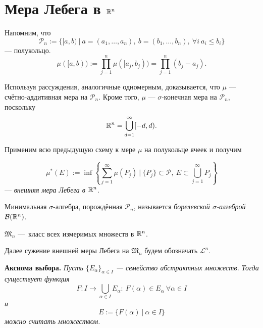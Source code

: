\section{Мера Лебега в $\mathbb{R}^n$}

Напомним, что 
\[\mathcal{P}_n := \{[a,b) \ | \ a = (a_1, \dots, a_n), \ b = (b_1, \dots, b_n), \ \forall i \ a_i \leqslant b_i\}\]
— полукольцо.
\[\mu([a,b)) := \prod\limits_{j=1}^{n} \mu([a_j, b_j)) = \prod\limits_{j=1}^{n} (b_j - a_j).\]

\begin{remark}
    Используя рассуждения, аналогичные одномерным, доказывается, что $\mu$ — счётно-аддитивная мера на $\mathcal{P}_n$.
    Кроме того, $\mu$ — $\sigma$-конечная мера на $\mathcal{P}_n$, поскольку
    \[\mathbb{R}^n = \bigcup\limits_{d=1}^{\infty}[-d, d).\]
\end{remark}

Применим всю предыдущую схему к мере $\mu$ на полукольце ячеек и получим
\begin{definition}
    \[\mu^*(E) := \inf \left\{ \sum\limits_{j=1}^{\infty} \mu(P_j) \ \Big| \ \{P_j\} \subset \mathcal{P}, \ E \subset \bigcup\limits_{j=1}^{\infty} P_j\right\}\]
    — \textit{внешняя мера Лебега в $\mathbb{R}^n$}.
\end{definition} 

\begin{definition}
    Минимальная $\sigma$-алгебра, порождённая $\mathcal{P}_n$, называется \textit{борелевской $\sigma$-алгеброй} $\mathcal{B}(\mathbb{R}^n)$.
\end{definition} 

\begin{definition}
    $\mathfrak{M}_n$ — класс всех измеримых множеств в $\mathbb{R}^n$.
\end{definition} 

\begin{remark}
    Далее сужение внешней меры Лебега на $\mathfrak{M}_n$ будем обозначать $\mathcal{L}^n$.
\end{remark}

\noindent \textbf{Аксиома выбора.}
\textit{Пусть $\{E_{\alpha}\}_{\alpha \in I}$ — семейство абстрактных множеств.
Тогда существует функция
\[F: I \to \bigcup\limits_{\alpha \in I} E_{\alpha}: \ F(\alpha) \in E_{\alpha} \ \forall \alpha \in I\]
и
\[E := \{F(\alpha) \ | \ \alpha \in I\}\]
можно считать множеством.}

